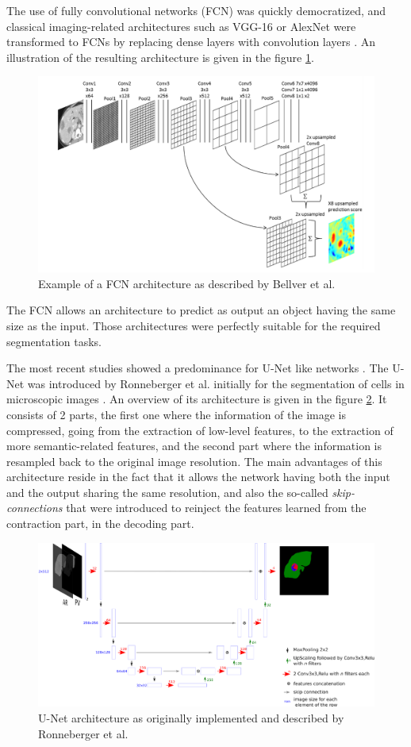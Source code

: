 \documentclass[]{article}
\begin{document}
	The use of fully convolutional networks (FCN) was quickly democratized,
	and classical imaging-related architectures such as VGG-16 or AlexNet
	were transformed to FCNs by replacing dense layers with convolution
	layers \cite{Ben-Cohen, Bellver2017}. An illustration of the resulting architecture is given in the figure \ref{Bellver_FCN}. 
	
	\begin{figure}[th!]
		\centering
		\includegraphics[width=0.7\linewidth]{images/image3}
		\caption{Example of a FCN architecture as described by Bellver et al. \cite{Bellver2017}}
		\label{Bellver_FCN}
	\end{figure}
	
	
	The FCN allows an architecture to predict as output an object having the
	same size as the input. Those architectures were perfectly suitable for
	the required segmentation tasks.
	
	The most recent studies showed a predominance for U-Net like networks \cite{Vorontsov2018, Yuan2017}. The U-Net was
	introduced by Ronneberger et al. initially for the segmentation of cells
	in microscopic images \cite{Ronneberger2015}. An overview of its architecture is given in the
	figure \ref{U_Net_Figure}. It consists of 2 parts, the first one where the
	information of the image is compressed, going from the extraction of
	low-level features, to the extraction of more semantic-related features,
	and the second part where the information is resampled back to the
	original image resolution. The main advantages of this architecture
	reside in the fact that it allows the network having both the input and
	the output sharing the same resolution, and also the so-called
	\emph{skip-connections} that were introduced to reinject the features
	learned from the contraction part, in the decoding part.
	
	\begin{figure}[th!]
		\centering
		\includegraphics[width=0.7\linewidth]{images/image28}
		\caption{U-Net architecture as originally implemented and described by Ronneberger et al. \cite{Ronneberger2015}}
		\label{U_Net_Figure}
	\end{figure}
	
\end{document}
